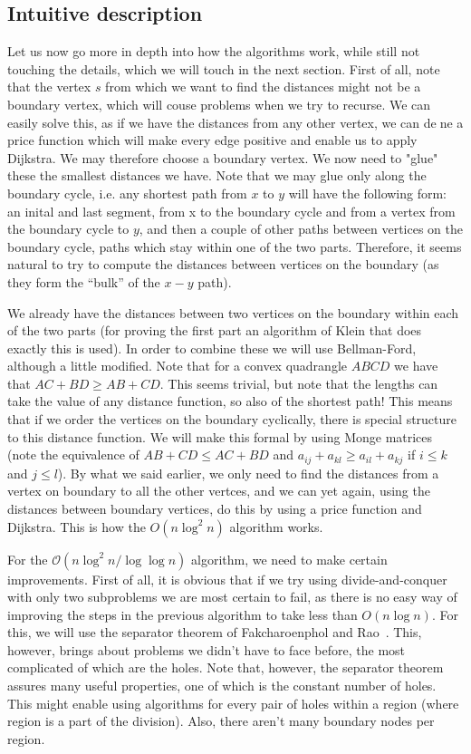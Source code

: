 \documentclass[12pt]{article}
\begin{document}
\subsection{Intuitive description}
\label{sec:intu-descr}


Let us now go more in depth into how the algorithms work, while still not touching the details, which we will touch in the next section. First of all, note that the vertex $s$ from which we want to find the distances might not be a boundary vertex, which will couse problems when we try to recurse. We can easily solve this, as if we have the distances from any other vertex, we can dene a price function which will make every edge positive and enable us to apply Dijkstra. We may therefore choose a boundary vertex. We now need to "glue" these the smallest distances we have. Note that we may glue only along the boundary cycle, i.e. any shortest path from $x$ to $y$ will have the following form: an inital and last segment, from x to the boundary cycle and from a vertex from the boundary cycle to $y$, and then a couple of other paths between vertices on the boundary cycle, paths which stay within one of the two parts. Therefore, it seems natural to try to compute the distances between vertices on the boundary (as they form the ``bulk'' of the $x-y$ path).

We already have the distances between two vertices on the boundary within each of the two parts (for proving the first part an algorithm of Klein that does exactly this is used). In order to combine these we will use Bellman-Ford, although a little modified. Note that for a convex quadrangle $ABCD$ we have that $AC + BD \geq AB + CD$. This seems trivial, but note that the lengths can take the value of any distance function, so also of the shortest path! This means that if we order the vertices on the boundary cyclically, there is special structure to this distance function. We will make this formal by using Monge matrices (note the equivalence of $AB + CD \leq AC + BD$ and $a_{ij} + a_{kl} \geq a_{il} + a_{kj}$ if $i \leq k$ and $j \leq l$). By what we said earlier, we only need to find the distances from a vertex on boundary to all the other vertces, and we can yet again, using the distances between boundary vertices, do this by using a price function and Dijkstra. This is how the $O(n \log^2 n)$ algorithm works.

For the $\mathcal{O}(n \log^2 n/ \log \log n)$ algorithm, we need to make certain improvements. First of all, it is obvious that if we try using divide-and-conquer with only two subproblems we are most certain to fail, as there is no easy way of improving the steps in the previous algorithm to take less than $O(n \log n)$. For this, we will use the separator theorem of Fakcharoenphol and Rao~\cite{fakcharoenphol2001planar}. This, however, brings about problems we didn’t have to face before, the most complicated of which are the holes. Note that, however, the separator theorem assures many useful properties, one of which is the constant number of holes. This might enable using algorithms for every pair of holes within a region (where region is a part of the division). Also, there aren’t many boundary nodes per region.



\end{document}
